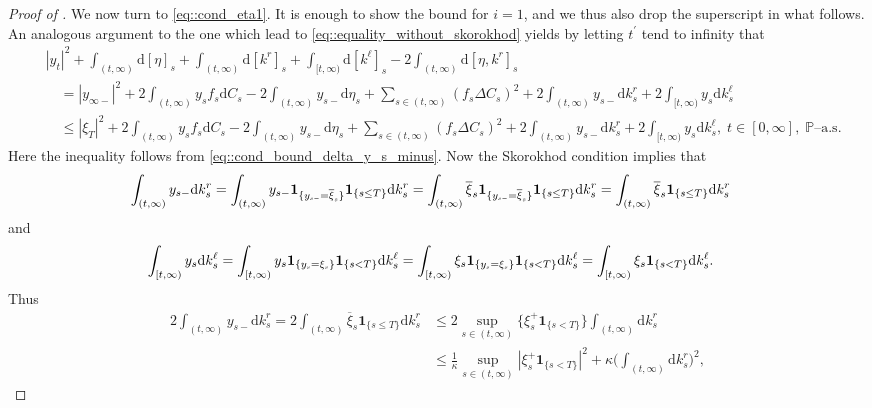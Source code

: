 \documentclass[10pt]{article} %
\newcommand{\smalltext}[1]{\text{\fontsize{4}{4}\selectfont$#1$}}
\def \P{\mathbb{P}}
\newcommand{\1}{\mathbf{1}}
\def\d{\mathrm{d}}
\begin{document}
\begin{proof}[Proof of ]
\medskip
We now turn to \eqref{eq::cond_eta1}. It is enough to show the bound for $i = 1$, and we thus also drop the superscript in what follows. An analogous argument to the one which lead to \eqref{eq::equality_without_skorokhod} yields by letting $t^\prime$ tend to infinity that
\begin{align}\label{eq::apriori4}
	&|y_t|^2 + \int_{(t,\infty)}\d[\eta]_s + \int_{(t,\infty)}\d[k^r]_s + \int_{[t,\infty)} \d[k^\ell]_s - 2\int_{(t,\infty)}\d[\eta, k^r]_s \nonumber\\
	&\quad = |y_{\infty-}|^2 + 2\int_{(t,\infty)} y_s f_s  \d C_s - 2 \int_{(t,\infty)} y_{s-} \d\eta_s + \sum_{s \in (t,\infty)} (f_s\Delta C_s)^2 + 2 \int_{(t,\infty)} y_{s-} \d k^r_s + 2 \int_{[t,\infty)} y_s \d k^\ell_s \nonumber\\
	&\quad \leq |\xi_T|^2 + 2\int_{(t,\infty)} y_s f_s  \d C_s - 2 \int_{(t,\infty)} y_{s-} \d\eta_s + \sum_{s \in (t,\infty)} (f_s\Delta C_s)^2 + 2 \int_{(t,\infty)} y_{s-} \d k^r_s + 2 \int_{[t,\infty)} y_s \d k^\ell_s, \; t \in [0,\infty], \; \text{$\P$--a.s.}
\end{align}
Here the inequality follows from \eqref{eq::cond_bound_delta_y_s_minus}. Now the Skorokhod condition implies that
\begin{align*}
	\int_{(t,\infty)} y_{s-} \d  k^r_s &= \int_{(t,\infty)} y_{s-} \mathbf{1}_{\{y_{\smalltext{s}\smalltext{-}} = \overline\xi_\smalltext{s}\}} \1_{\{s \leq T\}} \d  k^r_s = \int_{(t,\infty)} \overline\xi_s \mathbf{1}_{\{y_{\smalltext{s}\smalltext{-}} = \overline\xi_\smalltext{s}\}} \1_{\{s \leq T\}} \d  k^r_s = \int_{(t,\infty)} \overline\xi_s \1_{\{s \leq T\}} \d k^r_s
\end{align*}
and
\begin{align*}
	\int_{[t,\infty)} y_s \d k^\ell_s &= \int_{[t,\infty)} y_s \mathbf{1}_{\{y_\smalltext{s} = \xi_\smalltext{s}\}}\1_{\{s < T\}}\d k^\ell_s = \int_{[t,\infty)} \xi_s \mathbf{1}_{\{y_\smalltext{s} = \xi_\smalltext{s}\}} \1_{\{s < T\}} \d k^\ell_s = \int_{[t,\infty)} \xi_s \1_{\{s < T\}} \d k^\ell_s.
\end{align*}
Thus
\begin{align}\label{eq::cond_kr}
	2\int_{(t,\infty)} y_{s-} \d  k^r_s = 2\int_{(t,\infty)} \overline{\xi}_s \mathbf{1}_{\{s \leq T\}} \d k^r_s &\leq 2 \sup_{s \in (t,\infty)} \big\{\xi^+_s \mathbf{1}_{\{s < T\}}\big\} \int_{(t,\infty)} \d k^r_s \nonumber\\
	&\leq \frac{1}{\kappa} \sup_{s \in (t,\infty)} |\xi^+_s\mathbf{1}_{\{s < T\}}|^2  + \kappa \bigg(\int_{(t,\infty)} \d k^r_s \bigg)^2,

\end{align}
\end{proof}
\end{document}
